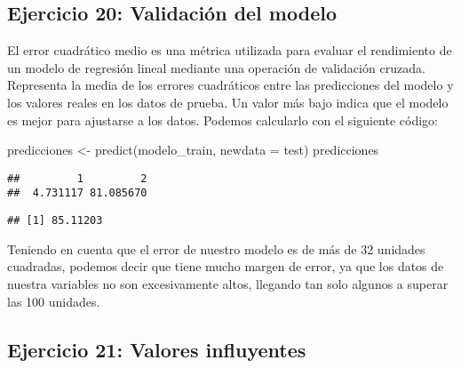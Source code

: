 \documentclass[
]{article}
\newenvironment{Shaded}{\begin{snugshade}}{\end{snugshade}}
\newcommand{\AttributeTok}[1]{\textcolor[rgb]{0.77,0.63,0.00}{#1}}
\newcommand{\DecValTok}[1]{\textcolor[rgb]{0.00,0.00,0.81}{#1}}
\newcommand{\FunctionTok}[1]{\textcolor[rgb]{0.00,0.00,0.00}{#1}}
\newcommand{\NormalTok}[1]{#1}
\newcommand{\OtherTok}[1]{\textcolor[rgb]{0.56,0.35,0.01}{#1}}
\newcommand{\SpecialCharTok}[1]{\textcolor[rgb]{0.00,0.00,0.00}{#1}}
\begin{document}
\hypertarget{ejercicio-20-validaciuxf3n-del-modelo}{%
\subsection{Ejercicio 20: Validación del
modelo}\label{ejercicio-20-validaciuxf3n-del-modelo}}

El error cuadrático medio es una métrica utilizada para evaluar el
rendimiento de un modelo de regresión lineal mediante una operación de
validación cruzada. Representa la media de los errores cuadráticos entre
las predicciones del modelo y los valores reales en los datos de prueba.
Un valor más bajo indica que el modelo es mejor para ajustarse a los
datos. Podemos calcularlo con el siguiente código:

\begin{Shaded}
\begin{Highlighting}[]
\NormalTok{predicciones }\OtherTok{\textless{}{-}} \FunctionTok{predict}\NormalTok{(modelo\_train, }\AttributeTok{newdata =}\NormalTok{ test)}
\NormalTok{predicciones}
\end{Highlighting}
\end{Shaded}

\begin{verbatim}
##         1         2 
##  4.731117 81.085670
\end{verbatim}

\begin{Shaded}
\end{Shaded}

\begin{verbatim}
## [1] 85.11203
\end{verbatim}

Teniendo en cuenta que el error de nuestro modelo es de más de 32
unidades cuadradas, podemos decir que tiene mucho margen de error, ya
que los datos de nuestra variables no son excesivamente altos, llegando
tan solo algunos a superar las 100 unidades.

\hypertarget{ejercicio-21-valores-influyentes}{%
\subsection{Ejercicio 21: Valores
influyentes}\label{ejercicio-21-valores-influyentes}}
\end{document}
